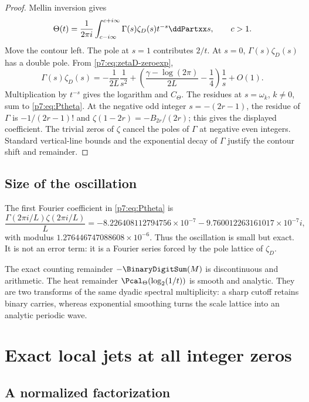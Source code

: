 \documentclass[11pt]{article}
\numberwithin{equation}{section}
\theoremstyle{definition}
\theoremstyle{remark}
\begin{document}
\begin{proof}
Mellin inversion gives
\[
 \Theta(t)=\frac1{2\pi i}\int_{c-i\infty}^{c+i\infty}
 \Gamma(s)\zeta_D(s)t^{-s}\ddPartxx s,
 \qquad c>1.
\]
Move the contour left.  The pole at $s=1$ contributes $2/t$.  At $s=0$, $\Gamma(s)\zeta_D(s)$ has a double pole.  From \cref{p7:eq:zetaD-zeroexp},
\[
 \Gamma(s)\zeta_D(s)
 =-\frac1{2L}\frac1{s^2}
 +\left(\frac{\gamma-\log(2\pi)}{2L}-\frac14\right)\frac1s+O(1).
\]
Multiplication by $t^{-s}$ gives the logarithm and $C_\Theta$.  The residues at $s=\omega_k$, $k\ne0$, sum to \cref{p7:eq:Ptheta}.  At the negative odd integer $s=-(2r-1)$, the residue of $\Gamma$ is $-1/(2r-1)!$ and $\zeta(1-2r)=-B_{2r}/(2r)$; this gives the displayed coefficient.  The trivial zeros of $\zeta$ cancel the poles of $\Gamma$ at negative even integers.  Standard vertical-line bounds and the exponential decay of $\Gamma$ justify the contour shift and remainder.
\end{proof}

\subsection{Size of the oscillation}

The first Fourier coefficient in \cref{p7:eq:Ptheta} is
\begin{equation}\label{p7:eq:Pfirst}
 \frac{\Gamma(2\pi i/L)\zeta(2\pi i/L)}L
 =-8.226408112794756\times10^{-7}
  -9.760012263161017\times10^{-7}i,
\end{equation}
with modulus $1.276446747088608\times10^{-6}$.  Thus the oscillation is small but exact.  It is not an error term: it is a Fourier series forced by the pole lattice of $\zeta_D$.

\begin{remark}
The exact counting remainder $-\BinaryDigitSum(M)$ is discontinuous and arithmetic.  The heat remainder $\Pcal_\Theta(\log_2(1/t))$ is smooth and analytic.  They are two transforms of the same dyadic spectral multiplicity: a sharp cutoff retains binary carries, whereas exponential smoothing turns the scale lattice into an analytic periodic wave.
\end{remark}

\section{Exact local jets at all integer zeros}

\subsection{A normalized factorization}
\end{document}
